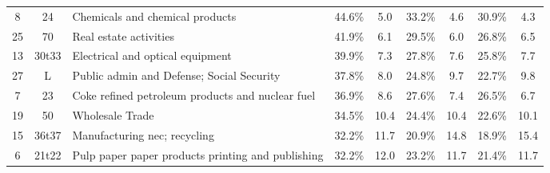 \documentclass[10pt]{article}
\begin{document}
\begin{table}[!h]
{\begin{tabular}{cc|lcccccc}
8                                 & 24                        & \multicolumn{1}{l|}{Chemicals and chemical products}                                        & 44.6\% & \multicolumn{1}{c|}{5.0}                         & 33.2\% & \multicolumn{1}{c|}{4.6}                         & 30.9\%              & 4.3               \\
25                                & 70                        & \multicolumn{1}{l|}{Real estate activities}                                                 & 41.9\% & \multicolumn{1}{c|}{6.1}                         & 29.5\% & \multicolumn{1}{c|}{6.0}                         & 26.8\%              & 6.5               \\
13                                & 30t33                     & \multicolumn{1}{l|}{Electrical and optical equipment}                                       & 39.9\% & \multicolumn{1}{c|}{7.3}                         & 27.8\% & \multicolumn{1}{c|}{7.6}                         & 25.8\%              & 7.7               \\
27                                & L                         & \multicolumn{1}{l|}{Public admin and Defense; Social Security}                              & 37.8\% & \multicolumn{1}{c|}{8.0}                         & 24.8\% & \multicolumn{1}{c|}{9.7}                         & 22.7\%              & 9.8               \\
7                                 & 23                        & \multicolumn{1}{l|}{Coke refined petroleum products and nuclear fuel}                       & 36.9\% & \multicolumn{1}{c|}{8.6}                         & 27.6\% & \multicolumn{1}{c|}{7.4}                         & 26.5\%              & 6.7               \\
19                                & 50                        & \multicolumn{1}{l|}{Wholesale Trade}                                                        & 34.5\% & \multicolumn{1}{c|}{10.4}                        & 24.4\% & \multicolumn{1}{c|}{10.4}                        & 22.6\%              & 10.1              \\
15                                & 36t37                     & \multicolumn{1}{l|}{Manufacturing nec; recycling}                                           & 32.2\% & \multicolumn{1}{c|}{11.7}                        & 20.9\% & \multicolumn{1}{c|}{14.8}                        & 18.9\%              & 15.4              \\
6                                 & 21t22                     & \multicolumn{1}{l|}{Pulp paper paper products printing and publishing}                      & 32.2\% & \multicolumn{1}{c|}{12.0}                        & 23.2\% & \multicolumn{1}{c|}{11.7}                        & 21.4\%              & 11.7              \\

\end{tabular}}
\end{table}
\end{document}
